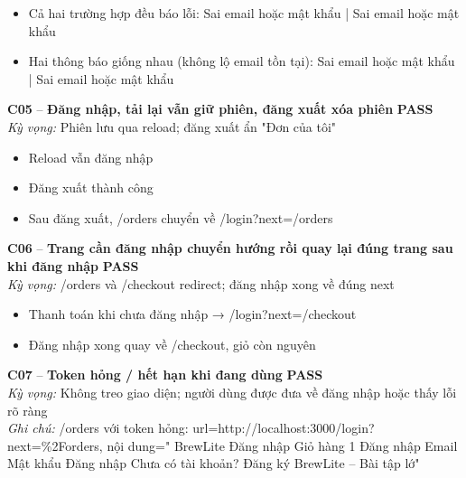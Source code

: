 \documentclass[a4paper,11pt]{article}
\newcommand{\ok}{\textcolor{okgreen}{\textbf{PASS}}}
\begin{document}
\begin{itemize}\footnotesize
\item \tick Cả hai trường hợp đều báo lỗi: Sai email hoặc mật khẩu | Sai email hoặc mật khẩu
\item \tick Hai thông báo giống nhau (không lộ email tồn tại): Sai email hoặc mật khẩu | Sai email hoặc mật khẩu
\end{itemize}
\begin{minipage}{\textwidth}\vspace{4pt}\textbf{\textcolor{brew}{C05}} -- \textbf{Đăng nhập, tải lại vẫn giữ phiên, đăng xuất xóa phiên} \hfill \ok\\
{\small\emph{Kỳ vọng:} Phiên lưu qua reload; đăng xuất ẩn "Đơn của tôi"}
\end{minipage}
\begin{itemize}\footnotesize
\item \tick Reload vẫn đăng nhập
\item \tick Đăng xuất thành công
\item \tick Sau đăng xuất, /orders chuyển về /login?next=/orders
\end{itemize}
\begin{minipage}{\textwidth}\vspace{4pt}\textbf{\textcolor{brew}{C06}} -- \textbf{Trang cần đăng nhập chuyển hướng rồi quay lại đúng trang sau khi đăng nhập} \hfill \ok\\
{\small\emph{Kỳ vọng:} /orders và /checkout redirect; đăng nhập xong về đúng next}
\end{minipage}
\begin{itemize}\footnotesize
\item \tick Thanh toán khi chưa đăng nhập → /login?next=/checkout
\item \tick Đăng nhập xong quay về /checkout, giỏ còn nguyên
\end{itemize}
\begin{minipage}{\textwidth}\vspace{4pt}\textbf{\textcolor{brew}{C07}} -- \textbf{Token hỏng / hết hạn khi đang dùng} \hfill \ok\\
{\small\emph{Kỳ vọng:} Không treo giao diện; người dùng được đưa về đăng nhập hoặc thấy lỗi rõ ràng}
\\{\small\emph{Ghi chú:} /orders với token hỏng: url=http://localhost:3000/login?next=\%2Forders, nội dung=" BrewLite Đăng nhập  Giỏ hàng 1 Đăng nhập Email Mật khẩu Đăng nhập  Chưa có tài khoản? Đăng ký  BrewLite – Bài tập lớ"}
\end{minipage}
\end{document}
